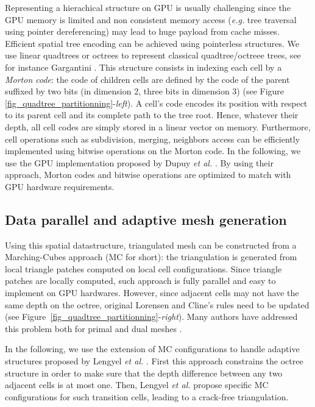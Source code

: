 \documentclass{llncs}
\begin{document}
Representing a hierachical structure on GPU is usually challenging
since the GPU memory is limited and non consistent 
memory access (\emph{e.g.} tree traversal using pointer dereferencing)
may lead to huge payload from cache misses.  Efficient spatial tree
encoding can be achieved using pointerless structures. We use
linear quadtrees or octrees to represent classical quadtree/octreee
trees, see for instance Gargantini
\cite{gargantini1982effective}. This structure consists in indexing
each cell by a \emph{Morton code}: the code of children cells are
defined by the code of the parent suffixed by two bits (in dimension
2, three bits in dimension 3) (see Figure
\ref{fig_quadtree_partitionning}-\emph{left}). A cell's code encodes
 its position with respect to its parent cell and its
complete path to the tree root. Hence, whatever their depth, all cell
codes are simply stored in a linear vector on memory. Furthermore,
cell operations such as subdivision, merging, neighbors access can be
efficiently implemented using bitwise operations on the Morton code.
In the following, we use the GPU implementation proposed by Dupuy
\textit{et al.}  \cite{dupuy2014quadtrees}. By using their approach, Morton
codes and bitwise operations are optimized to match with GPU hardware
requirements.

\subsection{Data parallel and adaptive mesh generation}



Using this spatial datastructure, triangulated mesh can be constructed
from a Marching-Cubes approach \cite{lorensen1987marching} (MC for short): the
triangulation is generated from local triangle patches computed on
local cell configurations. Since triangle patches are locally
computed, such approach is fully parallel and easy to implement on GPU
hardwares. However, since adjacent cells may not have the same depth
on the octree, original Lorensen and Cline's rules need to be
updated (see Figure~\ref{fig_quadtree_partitionning}-\emph{right}). Many authors have addressed this problem both for primal and
dual meshes
\cite{shu1995adaptive,schaefer2004dual,lengyel2010voxel,DBLP:journals/cgf/LewinerMPPL10,DBLP:journals/cvgip/LobelloDD14}.

In the following, we use the extension of MC configurations to handle
adaptive structures proposed by Lengyel \emph{et al.}
\cite{lengyel2010voxel}. First this approach constrains the octree
structure in order to make sure that the depth difference between any
two adjacent cells is at most one. Then, Lengyel \emph{et al.} propose
specific MC configurations for such transition cells,  leading to a
crack-free triangulation.
\end{document}
